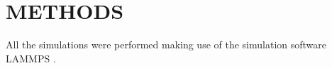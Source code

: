 \newpage
\section{METHODS}
All the simulations  were performed making use of the simulation software LAMMPS
\cite{LAMMPSDocumentation,steveplimptonLAMMPS}
.










